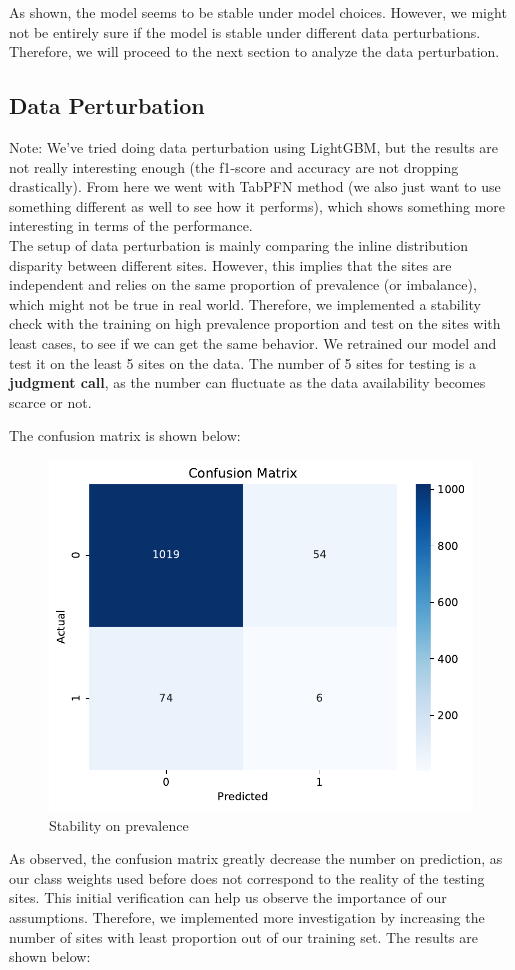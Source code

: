 \documentclass[10pt,letterpaper]{article}
\begin{document}
As shown, the model seems to be stable under model choices. However, we might not be entirely sure if the model is stable under different
data perturbations. Therefore, we will proceed to the next section to analyze the data perturbation.

\subsection{Data Perturbation}
Note: We've tried doing data perturbation using LightGBM, but the results are not really interesting enough 
(the f1-score and accuracy are not dropping drastically). From here we went with TabPFN method 
(we also just want to use something different as well to see how it performs), which shows something 
more interesting in terms of the performance. \\

The setup of data perturbation is mainly comparing the inline distribution disparity between different sites. 
However, this implies that the sites are independent and relies on the same proportion of prevalence (or imbalance), 
which might not be true in real world. Therefore, we implemented a stability check with the training on high prevalence 
proportion and test on the sites with least cases, to see if we can get the same behavior. We retrained our model and test 
it on the least 5 sites on the data. The number of 5 sites for testing is a \textbf{judgment call}, as the number can 
fluctuate as the data availability becomes scarce or not.  

The confusion matrix is shown below:

\begin{figure}[H]
    \centering
    \includegraphics[width=0.5\linewidth]{../plots/tabpfn_confusion_matrix_stab1.pdf}
    \caption{Stability on prevalence}
    \label{fig:stability1}
\end{figure}

As observed, the confusion matrix greatly decrease the number on prediction, as our class weights 
used before does not correspond to the reality of the testing sites. This initial verification can help us 
observe the importance of our assumptions. Therefore, we implemented more investigation by increasing
the number of sites with least proportion out of our training set. The results are shown below:
\end{document}
